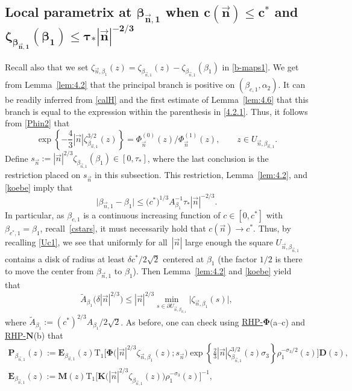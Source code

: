 \documentclass[10pt,a4paper]{amsart}
\numberwithin{equation}{section}
\newcommand{\n}{{\vec n}}
\newcommand{\rhn} {\textnormal{RHP}-${\boldsymbol N}$}
\newcommand{\rhphi} {\textnormal{RHP}-${\boldsymbol \Phi}$}
\begin{document}
\subsection[Local parametrix at beta\_n,1 when c(n)leq c\^* and zeta\_beta]{Local parametrix at $ \boldsymbol{\beta_{\n,1} }$ when $ \boldsymbol{c(\n)\leq c^* }$ and $ \boldsymbol{\zeta_{\beta_{\n,1}}(\beta_1) \leq \tau_* |\n|^{-2/3}} $}
\label{ss:64}

Recall also that we set $ \zeta_{\n,\beta_1}(z) = \zeta_{\beta_{\n,1}}(z)-\zeta_{\beta_{\n,1}}(\beta_1) $ in \eqref{b-maps1}. We get from Lemma~\ref{lem:4.2} that the principal branch \smash{$ \zeta_{\beta_{\n,1}}^{3/2}(z) $} is positive on $ (\beta_{c,1},\alpha_2) $. It can be readily inferred from \eqref{calH} and the first estimate of Lemma~\ref{lem:4.6} that this branch is equal to the expression within the parenthesis in \eqref{4.2.1}. Thus, it follows from \eqref{Phin2} that
\begin{equation}
\label{rhphi-4}
\exp\left\{-\frac43|\n|\zeta_{\beta_{\n,1}}^{3/2}(z) \right\} = \Phi_\n^{(0)}(z)/\Phi_\n^{(1)}(z), \qquad z\in U_{\n,\beta_{\n,1}}.
\end{equation}
Define $ s_\n := |\n|^{2/3} \zeta_{\beta_{\n,1}}(\beta_1) \in [0,\tau_*] $, where the last conclusion is the restriction placed on $ s_\n $ in this subsection. This restriction, Lemma~\ref{lem:4.2}, and \eqref{koebe} imply that
\[
\big|\beta_{\n,1} - \beta_1 \big| \leq \bigl( c^*)^{1/3} A_{\beta_1}^{-1} \tau_* |\n|^{-2/3}.
\]
In particular, as $ \beta_{c,1} $ is a continuous increasing function of $ c\in[0,c^*] $ with $ \beta_{c^*,1}=\beta_1 $, recall~\eqref{cstars}, it must necessarily hold that $ c(\n)\to c^* $. Thus, by recalling \eqref{Uc1}, we see that uniformly for all~$ |\n| $ large enough the square $ U_{\n,\beta_{\n,1}} $ contains a disk of radius at least $ \delta c^*/2\sqrt 2 $ centered at $ \beta_1 $ (the factor $ 1/2 $ is there to move the center from $ \beta_{\n,1} $ to $ \beta_1 $). Then Lemma~\ref{lem:4.2} and \eqref{koebe} yield that
\begin{equation}
\label{rhphi-6}
\tilde A_{\beta_1} \bigl( \delta |\n|^{2/3} \bigr) \leq |\n|^{2/3} \min_{s\in\partial U_{\n,\beta_{\n,1}}} \big|\zeta_{\n,\beta_1}(s)\big|,
\end{equation}
where $ \tilde A_{\beta_1} := (c^*)^{2/3}A_{\beta_1}/2\sqrt 2 $. As before, one can check using \hyperref[rhphi]{\rhphi}(a--c) and \hyperref[rhn]{\rhn}(b) that
\begin{gather}
\boldsymbol P_{\beta_{\n,1}}(z) := \boldsymbol E_{\beta_{\n,1}}(z) \mathrm{T}_1\big[ \boldsymbol\Phi\bigl(|\n|^{2/3} \zeta_{\n,\beta_1}(z);s_\n\bigr) \exp\left\{\frac23|\n|\zeta_{\beta_{\n,1}}^{3/2}(z)\sigma_3 \right\} \rho_1^{-\sigma_3/2}(z) \big] \boldsymbol D(z), \nonumber\\
\boldsymbol E_{\beta_{\n,1}}(z) := \boldsymbol M(z)\mathrm{T}_1\big[ \boldsymbol K \bigl(|\n|^{2/3}\zeta_{\beta_{\n,1}}(z)\bigr) \rho_1^{-\sigma_3}(z)\big]^{-1},\label{rhphi-5}
\end{gather}
\end{document}
